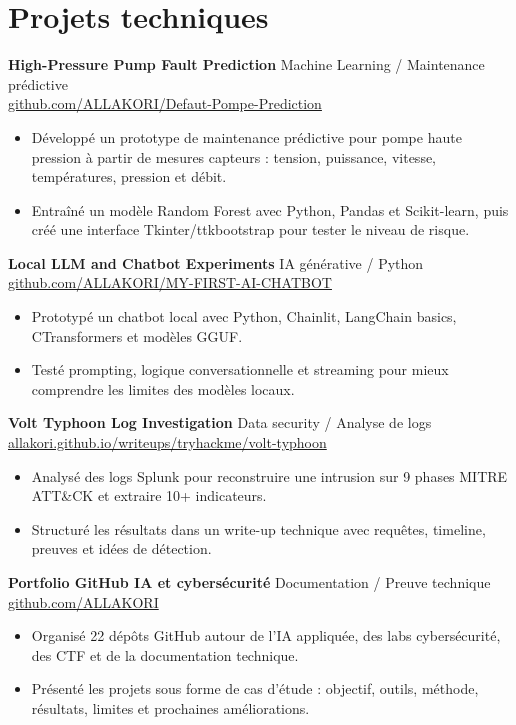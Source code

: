 \documentclass[10pt,a4paper]{article}
\begin{document}
\section{Projets techniques}
\textbf{High-Pressure Pump Fault Prediction} \hfill Machine Learning / Maintenance prédictive\\
\href{https://github.com/ALLAKORI/Defaut-Pompe-Prediction}{github.com/ALLAKORI/Defaut-Pompe-Prediction}
\begin{itemize}
  \item Développé un prototype de maintenance prédictive pour pompe haute pression à partir de mesures capteurs : tension, puissance, vitesse, températures, pression et débit.
  \item Entraîné un modèle Random Forest avec Python, Pandas et Scikit-learn, puis créé une interface Tkinter/ttkbootstrap pour tester le niveau de risque.
\end{itemize}

\textbf{Local LLM and Chatbot Experiments} \hfill IA générative / Python\\
\href{https://github.com/ALLAKORI/MY-FIRST-AI-CHATBOT}{github.com/ALLAKORI/MY-FIRST-AI-CHATBOT}
\begin{itemize}
  \item Prototypé un chatbot local avec Python, Chainlit, LangChain basics, CTransformers et modèles GGUF.
  \item Testé prompting, logique conversationnelle et streaming pour mieux comprendre les limites des modèles locaux.
\end{itemize}

\textbf{Volt Typhoon Log Investigation} \hfill Data security / Analyse de logs\\
\href{https://allakori.github.io/writeups/posts/volt-typhoon-intrusion/}{allakori.github.io/writeups/tryhackme/volt-typhoon}
\begin{itemize}
  \item Analysé des logs Splunk pour reconstruire une intrusion sur 9 phases MITRE ATT\&CK et extraire 10+ indicateurs.
  \item Structuré les résultats dans un write-up technique avec requêtes, timeline, preuves et idées de détection.
\end{itemize}

\textbf{Portfolio GitHub IA et cybersécurité} \hfill Documentation / Preuve technique\\
\href{https://github.com/ALLAKORI}{github.com/ALLAKORI}
\begin{itemize}
  \item Organisé 22 dépôts GitHub autour de l'IA appliquée, des labs cybersécurité, des CTF et de la documentation technique.
  \item Présenté les projets sous forme de cas d'étude : objectif, outils, méthode, résultats, limites et prochaines améliorations.
\end{itemize}
\end{document}
